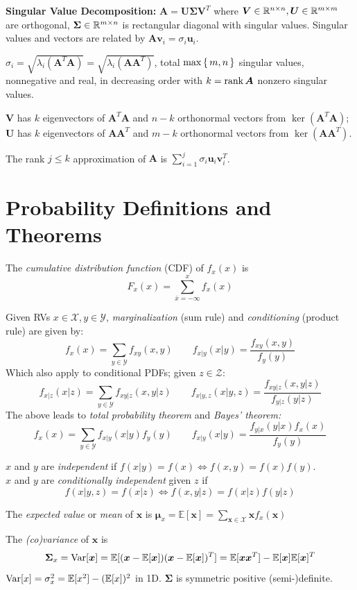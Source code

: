 \documentclass[twocolumn, 8pt]{extarticle}
\begin{document}
\textbf{Singular Value Decomposition:} $\bm A = \bm U\bm\Sigma\bm V^T$ where $\bm V \in \mathbb{R}^{n \times n}, \bm U \in \mathbb{R}^{m \times m}$
are orthogonal, $\bm\Sigma \in \mathbb{R}^{m \times n}$ is rectangular diagonal with singular values.
Singular values and vectors are related by $\bm A\bm v_i = \sigma _i\bm u _i$.

$\sigma _i = \sqrt{\lambda _i(\bm A^T\bm A)} = \sqrt{\lambda _i(\bm A\bm A^T)}$, total $\max\set{m, n}$ singular values,
nonnegative and real, in decreasing order with $k = \operatorname{rank}\bm A$ nonzero singular values.

$\bm V$ has $k$ eigenvectors of $\bm A^T\bm A$ and $n - k$ orthonormal vectors from $\ker(\bm A^T\bm A)$;
$\bm U$ has $k$ eigenvectors of $\bm A\bm A^T$ and $m - k$ orthonormal vectors from $\ker(\bm A\bm A^T)$.

The rank $j \leq k$ approximation of $\bm A$ is $\sum _{i = 1}^j \sigma _i\bm u_i\bm v_i^T$.

\section{Probability Definitions and Theorems} %

The \textit{cumulative distribution function} (CDF) of $f_x(x)$ is $$F_x(x) = \sum _{\bar x = -\infty}^x f_x(x)$$

Given RVs $x \in \mathcal X, y \in \mathcal Y$, \textit{marginalization} (sum rule) and \textit{conditioning}
(product rule) are given by:
$$f_x(x) = \sum _{y \in \mathcal Y} f_{xy}(x, y) \qquad f_{x|y}(x|y) = \frac{f_{xy}(x, y)}{f_y(y)}$$
Which also apply to conditional PDFs; given $z \in \mathcal Z$:
$$f_{x|z}(x|z) = \sum _{y \in \mathcal Y} f_{xy|z}(x, y|z) \qquad f_{x|y,z}(x|y, z) = \frac{f_{xy|z}(x, y|z)}{f_{y|z}(y|z)}$$
The above leads to \textit{total probability theorem} and \textit{Bayes' theorem:}
$$f_x(x) = \sum _{y \in \mathcal Y} f_{x|y}(x|y)f_y(y) \qquad f_{x|y}(x|y) = \frac{f_{y|x}(y|x)f_x(x)}{f_y(y)}$$

$x$ and $y$ are \textit{independent} if $f(x|y) = f(x) \iff f(x, y) = f(x)f(y)$.\\
$x$ and $y$ are \textit{conditionally independent} given $z$ if $$f(x|y, z) = f(x|z) \iff f(x, y|z) = f(x|z)f(y|z)$$

The \textit{expected value} or \textit{mean} of $\bm x$ is
$\displaystyle\bm\mu _x = \mathbb E[\bm x] = \sum _{\bm x \in \mathcal X} \bm xf_x(\bm x)$

The \textit{(co)variance} of $\bm x$ is
$$\bm\Sigma _x = \operatorname{Var}[\bm x] = \mathbb E[(\bm x - \mathbb E[\bm x])(\bm x - \mathbb E[\bm x])^T] = \mathbb E[\bm x\bm x^T] - \mathbb E[\bm x]\mathbb E[\bm x]^T$$
$\operatorname{Var}[x] = \sigma _x^2 = \mathbb E[x^2] - (\mathbb E[x])^2$ in 1D.
$\bm\Sigma$ is symmetric positive (semi-)definite.
\end{document}

